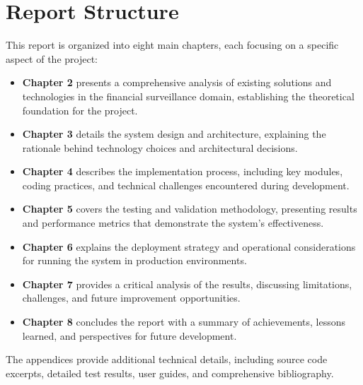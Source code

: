 \section{Report Structure}

This report is organized into eight main chapters, each focusing on a specific aspect of the project:

\begin{itemize}
    \item \textbf{Chapter 2} presents a comprehensive analysis of existing solutions and technologies in the financial surveillance domain, establishing the theoretical foundation for the project.
    
    \item \textbf{Chapter 3} details the system design and architecture, explaining the rationale behind technology choices and architectural decisions.
    
    \item \textbf{Chapter 4} describes the implementation process, including key modules, coding practices, and technical challenges encountered during development.
    
    \item \textbf{Chapter 5} covers the testing and validation methodology, presenting results and performance metrics that demonstrate the system's effectiveness.
    
    \item \textbf{Chapter 6} explains the deployment strategy and operational considerations for running the system in production environments.
    
    \item \textbf{Chapter 7} provides a critical analysis of the results, discussing limitations, challenges, and future improvement opportunities.
    
    \item \textbf{Chapter 8} concludes the report with a summary of achievements, lessons learned, and perspectives for future development.
\end{itemize}

The appendices provide additional technical details, including source code excerpts, detailed test results, user guides, and comprehensive bibliography.
